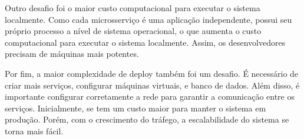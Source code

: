 Outro desafio foi o maior custo computacional para executar o sistema localmente. Como cada microsserviço é uma aplicação independente, possui seu próprio processo a nível de sistema operacional, o que aumenta o custo computacional para executar o sistema localmente. Assim, os desenvolvedores precisam de máquinas mais potentes.

Por fim, a maior complexidade de deploy também foi um desafio. É necessário de criar mais serviços, configurar máquinas virtuais,  e banco de dados. Além disso, é importante configurar corretamente a rede para garantir a comunicação entre os serviços. Inicialmente, se tem um custo maior para manter o sistema em produção. Porém, com o crescimento do tráfego, a escalabilidade do sistema se torna mais fácil.